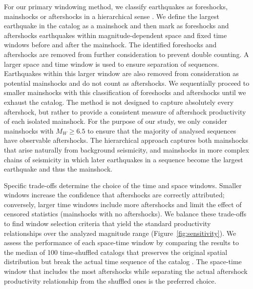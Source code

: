 \documentclass[draft, jgrga]{agujournal2018}
\begin{document}
For our primary windowing method, we classify earthquakes as foreshocks, mainshocks or aftershocks in a hierarchical sense \citep[following][]{felzer2006decay, Brodsky2011TheForeshocks, Wetzler2016, Garza-Giron2018Mainshock-AftershockRegions}. We define the largest earthquake in the catalog as a mainshock and then mark as foreshocks and aftershocks earthquakes within magnitude-dependent space and fixed time windows before and after the mainshock. The identified foreshocks and aftershocks are removed from further consideration to prevent double counting. A larger space and time window is used to ensure separation of sequences. Earthquakes within this larger window are also removed from consideration as potential mainshocks and do not count as aftershocks. We sequentially proceed to smaller mainshocks with this classification of foreshocks and aftershocks until we exhaust the catalog. The method is not designed to capture absolutely every aftershock, but rather to provide a consistent measure of aftershock productivity of each isolated mainshock. For the purpose of our study, we only consider mainshocks with $M_W\ge6.5$ to ensure that the majority of analysed sequences have observable aftershocks. The hierarchical approach captures both mainshocks that arise naturally from background seismicity, and mainshocks in more complex chains of seismicity in which later earthquakes in a sequence become the largest earthquake and thus the mainshock.

Specific trade-offs determine the choice of the time and space windows. Smaller windows increase the confidence that aftershocks are correctly attributed; conversely, larger time windows include more aftershocks and limit the effect of censored statistics (mainshocks with no aftershocks). We balance these trade-offs to find window selection criteria that yield the standard productivity relationships over the analyzed magnitude range (Figure~\ref{fig:sensitivity}). We assess the performance of each space-time window by comparing the results to the median of 100 time-shuffled catalogs that preserves the original spatial distribution but break the actual time sequence of the catalog \citep{Garza-Giron2018Mainshock-AftershockRegions}. The space-time window that includes the most aftershocks while separating the actual aftershock productivity relationship from the shuffled ones is the preferred choice.
\end{document}
